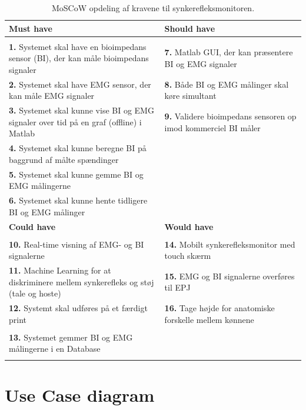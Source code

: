 \begin{table}[H]

\begin{tabularx}{\textwidth}{X|X}
\rowcolor{Gray}
\toprule
\textbf{Must have} & \textbf{Should have} \\
\hline \\
\textbf{1. }Systemet skal have en bioimpedans sensor (BI), der kan måle bioimpedans signaler & \textbf{7. }Matlab GUI, der kan præsentere BI og EMG signaler \\[4ex]
\textbf{2. }Systemet skal have EMG sensor, der kan måle EMG signaler & \textbf{8. }Både BI og EMG målinger skal køre simultant\\[4ex]
\textbf{3. }Systemet skal kunne vise BI og EMG signaler over tid på en graf (offline) i Matlab  & \textbf{9. }Validere bioimpedans sensoren op imod kommerciel BI måler \\[4ex]
\textbf{4. }Systemet skal kunne beregne BI på baggrund af målte spændinger & \\[4ex]
\textbf{5. }Systemet skal kunne gemme BI og EMG målingerne & \\[4ex]
\textbf{6. }Systemet skal kunne hente tidligere BI og EMG målinger & \\[4ex]


\midrule
    \rowcolor{Gray}
    \textbf{Could have} & \textbf{Would have}\\
    \midrule \\
    \textbf{10. }Real-time visning af EMG- og BI signalerne & \textbf{14. }Mobilt synkerefleksmonitor med touch skærm\\[4ex]
\textbf{11. }Machine Learning for at diskriminere mellem synkerefleks og støj (tale og hoste) & \textbf{15. }EMG og BI signalerne overføres til EPJ  \\[4ex]
\textbf{12. }Systemt skal udføres på et færdigt print& \textbf{16. }Tage højde for anatomiske forskelle mellem kønnene\\[4ex]
& \\
\textbf{13. }Systemet gemmer BI og EMG målingerne i en Database& \\[4ex]
& \\

\end{tabularx}

\caption{MoSCoW opdeling af kravene til  synkerefleksmonitoren.}
  \label{tab:moscow}
\end{table}

\section{Use Case diagram}


